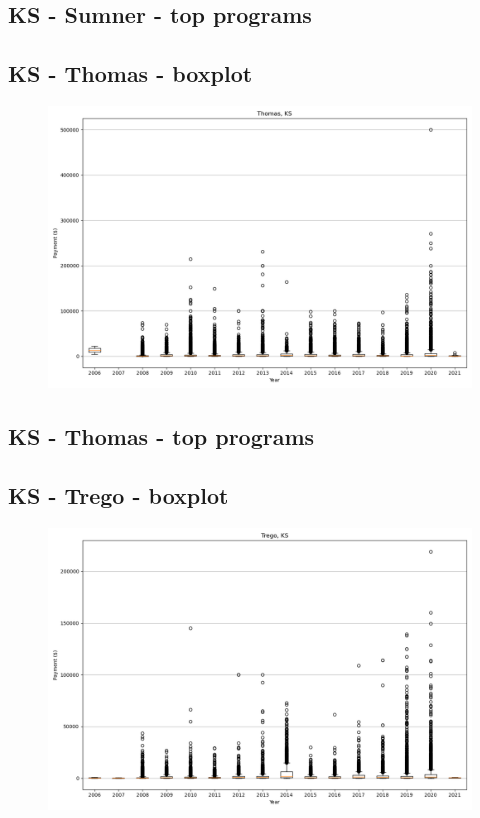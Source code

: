 \subsection*{KS - Sumner - top programs}

\newpage
\subsection*{KS - Thomas - boxplot}
\begin{figure}[h]
\centering
\includegraphics[width=7in]{../output/boxplots/counties/Thomas-KS_boxplot.png}
\end{figure}


\subsection*{KS - Thomas - top programs}

\newpage
\subsection*{KS - Trego - boxplot}
\begin{figure}[h]
\centering
\includegraphics[width=7in]{../output/boxplots/counties/Trego-KS_boxplot.png}
\end{figure}


